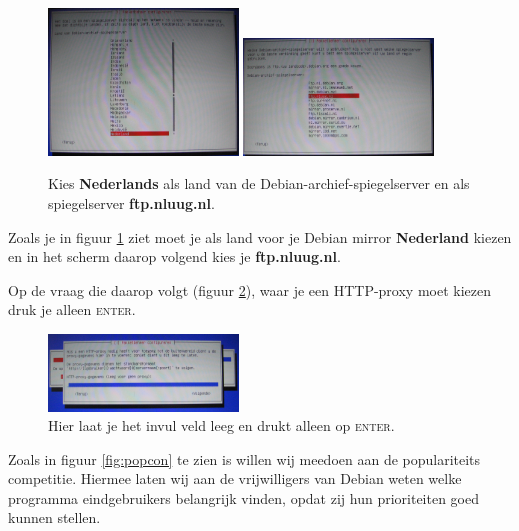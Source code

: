 \documentclass[12pt,a4paper]{article}
\begin{document}
\begin{figure}[H]
\centering
\includegraphics[width=0.45\textwidth]{pakketbeheer-landkeuze-scherm}
\includegraphics[width=0.45\textwidth]{pakketbeheer-mirror-scherm}
\caption{Kies \textbf{Nederlands} als land van de Debian-archief-spiegelserver en als spiegelserver \textbf{ftp.nluug.nl}.}
\label{fig:pakketten}
\end{figure}

Zoals je in figuur \ref{fig:pakketten} ziet moet je als land voor je Debian mirror \textbf{Nederland} kiezen en in het scherm daarop volgend kies je \textbf{ftp.nluug.nl}. 


Op de vraag die daarop volgt (figuur \ref{fig:httpproxy}), waar je een HTTP-proxy moet kiezen druk je alleen \textsc{enter}.

\begin{figure}[H]
\centering
\includegraphics[width=0.45\textwidth]{pakketbeheer-proxy-scherm}
\caption{Hier laat je het invul veld leeg en drukt alleen op \textsc{enter}.}
\label{fig:httpproxy}
\end{figure}

Zoals in figuur \ref{fig:popcon} te zien is willen wij meedoen aan de populariteits competitie. Hiermee laten wij aan de vrijwilligers van Debian weten welke programma eindgebruikers belangrijk vinden, opdat zij hun prioriteiten goed kunnen stellen.
\end{document}
